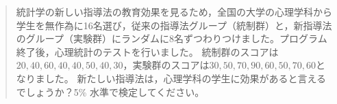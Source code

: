\begin{quote}
	統計学の新しい指導法の教育効果を見るため，全国の大学の心理学科から学生を無作為に16名選び，従来の指導法グループ（統制群）と，新指導法のグループ（実験群）にランダムに8名ずつわりつけました。プログラム終了後，心理統計のテストを行いました。
	統制群のスコアは$20, 40, 60, 40, 40, 50, 40, 30$，実験群のスコアは$30, 50, 70, 90, 60, 50, 70, 60$となりました。
	新たしい指導法は，心理学科の学生に効果があると言えるでしょうか？5\% 水準で検定してください。
\end{quote}
